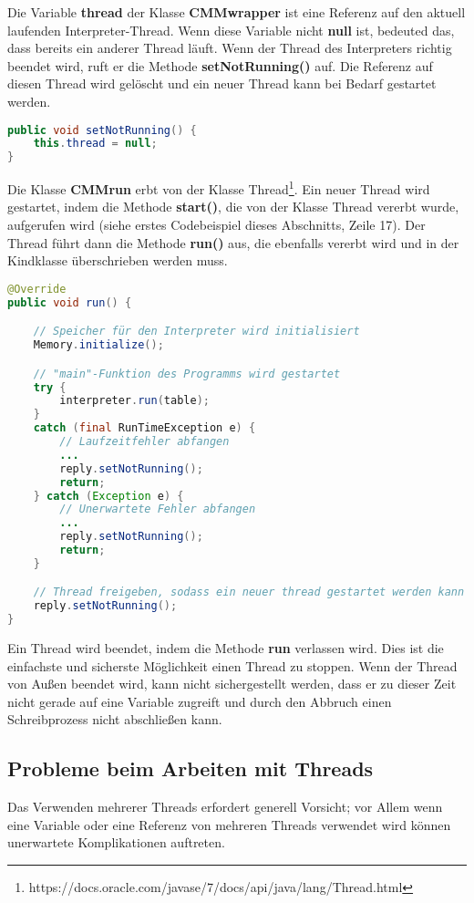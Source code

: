 Die Variable \textbf{thread} der Klasse \textbf{CMMwrapper} ist eine Referenz auf den aktuell laufenden Interpreter-Thread. Wenn diese Variable nicht \textbf{null} ist, bedeuted das, dass bereits ein anderer Thread läuft. Wenn der Thread des Interpreters richtig beendet wird, ruft er die Methode \textbf{setNotRunning()} auf. Die Referenz auf diesen Thread wird gelöscht und ein neuer Thread kann bei Bedarf gestartet werden.
\begin{lstlisting}[language=JAVA]
public void setNotRunning() {
	this.thread = null;
}
\end{lstlisting}

Die Klasse \textbf{CMMrun} erbt von der Klasse Thread\footnote{https://docs.oracle.com/javase/7/docs/api/java/lang/Thread.html}. Ein neuer Thread wird gestartet, indem die Methode \textbf{start()}, die von der Klasse Thread vererbt wurde, aufgerufen wird (siehe erstes Codebeispiel dieses Abschnitts, Zeile 17). Der Thread führt dann die Methode \textbf{run()} aus, die ebenfalls vererbt wird und in der Kindklasse überschrieben werden muss.
\begin{lstlisting}[language=JAVA]
@Override
public void run() {

	// Speicher für den Interpreter wird initialisiert
	Memory.initialize();

	// "main"-Funktion des Programms wird gestartet
	try {
		interpreter.run(table);
	}
	catch (final RunTimeException e) {
		// Laufzeitfehler abfangen
		... 
		reply.setNotRunning();
		return;
	} catch (Exception e) {
		// Unerwartete Fehler abfangen
		...
		reply.setNotRunning();
		return;
	}

	// Thread freigeben, sodass ein neuer thread gestartet werden kann
	reply.setNotRunning();
}
\end{lstlisting}

Ein Thread wird beendet, indem die Methode \textbf{run} verlassen wird. Dies ist die einfachste und sicherste Möglichkeit einen Thread zu stoppen. Wenn der Thread von Außen beendet wird, kann nicht sichergestellt werden, dass er zu dieser Zeit nicht gerade auf eine Variable zugreift und durch den Abbruch einen Schreibprozess nicht abschließen kann.

\subsection{Probleme beim Arbeiten mit Threads}
\label{sec:deb-impl-thread-problems}
Das Verwenden mehrerer Threads erfordert generell Vorsicht; vor Allem wenn eine Variable oder eine Referenz von mehreren Threads verwendet wird können unerwartete Komplikationen auftreten.

